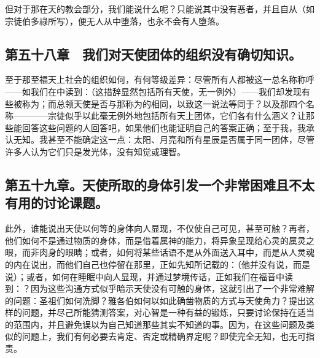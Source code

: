 但对于那在天的教会部分，我们能说什么呢？只能说其中没有恶者，并且自从（如宗徒伯多祿所写），便无人从中堕落，也永不会有人堕落。\par


\subsection{第五十八章　我们对天使团体的组织没有确切知识。}

至于那至福天上社会的组织如何，有何等级差异：尽管所有人都被这一总名称称呼——如我们在中读到：（这措辞显然包括所有天使，无一例外）——我们却发现有些被称为；而总领天使是否与那称为的相同，以致这一说法等同于？以及那四个名称————宗徒似乎以此毫无例外地包括所有天上团体，它们各有什么涵义？让那些能回答这些问题的人回答吧，如果他们也能证明自己的答案正确；至于我，我承认无知。我甚至不能确定这一点：太阳、月亮和所有星辰是否属于同一团体，尽管许多人认为它们只是发光体，没有知觉或理智。\par


\subsection{第五十九章。天使所取的身体引发一个非常困难且不太有用的讨论课题。}

此外，谁能说出天使以何等的身体向人显现，不仅使自己可见，甚至可触？\newline{}再者，他们如何不是通过物质的身体，而是借着属神的能力，将异象呈现给心灵的属灵之眼，而非肉身的眼睛；或者，如何将某些话语不是从外面送入耳中，而是从人灵魂的内在说出，而他们自己也停留在那里，正如先知所记载的：（他并没有说，而是说）；\newline{}或者，如何在睡眠中向人显现，并通过梦境传话，正如我们在福音中读到：？\newline{}因为这些沟通方式似乎暗示天使没有可触的身体，这就引出了一个非常难解的问题：圣祖们如何洗脚？雅各伯如何以如此确凿物质的方式与天使角力？\newline{}提出这样的问题，并尽己所能猜测答案，对心智是一种有益的锻炼，只要讨论保持在适当的范围内，并且避免误以为自己知道那些其实不知道的事。\newline{}因为，在这些问题及类似的问题上，我们有何必要去肯定、否定或精确界定呢？即使完全无知，也无可指责。\par

